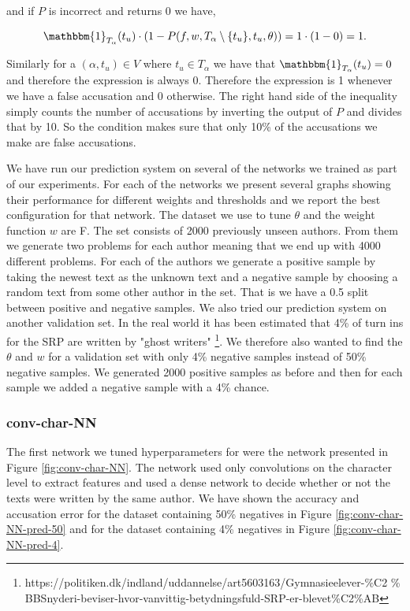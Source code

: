 and if $P$ is incorrect and returns 0 we have,

\begin{equation}
    \mathbbm{1}_{T_\alpha}(t_u) \cdot
    \left(1 - P(f, w, T_\alpha \setminus \{t_u\}, t_u, \theta)\right) =
    1 \cdot (1 - 0) = 1.
\end{equation}

Similarly for a $(\alpha, t_u) \in V$ where $t_u \in T_\alpha$ we have that
$\mathbbm{1}_{T_\alpha}(t_u) = 0$ and therefore the expression is always
0. Therefore the expression is 1 whenever we have a false accusation and 0
otherwise. The right hand side of the inequality simply counts the number of
accusations by inverting the output of $P$ and divides that by 10. So the
condition makes sure that only 10\% of the accusations we make are false
accusations.

We have run our prediction system on several of the networks we trained as
part of our experiments. For each of the networks we present several graphs
showing their performance for different weights and thresholds and we report
the best configuration for that network. The dataset we use to tune $\theta$
and the weight function $w$ are F. The set consists of 2000 previously unseen
authors. From them we generate two problems for each author meaning that we
end up with 4000 different problems. For each of the authors we generate a
positive sample by taking the newest text as the unknown text and a negative
sample by choosing a random text from some other author in the set. That is
we have a 0.5 split between positive and negative samples. We also tried our
prediction system on another validation set. In the real world it has been
estimated that 4\% of turn ins for the \gls{SRP} are written by "ghost writers"
\footnote{https://politiken.dk/indland/uddannelse/art5603163/Gymnasieelever-\%C2
\% BBSnyderi-beviser-hvor-vanvittig-betydningsfuld-SRP-er-blevet\%C2\%AB}. We
therefore also wanted to find the $\theta$ and $w$ for a validation set with
only 4\% negative samples instead of 50\% negative samples. We generated 2000
positive samples as before and then for each sample we added a negative sample
with a 4\% chance.


\subsubsection{\glsdesc{conv-char-NN}}

The first network we tuned hyperparameters for were the network presented
in Figure \ref{fig:conv-char-NN}. The network used only convolutions on the
character level to extract features and used a dense network to decide whether
or not the texts were written by the same author. We have shown the accuracy
and accusation error for the dataset containing 50\% negatives in Figure
\ref{fig:conv-char-NN-pred-50} and for the dataset containing 4\% negatives in
Figure \ref{fig:conv-char-NN-pred-4}.

